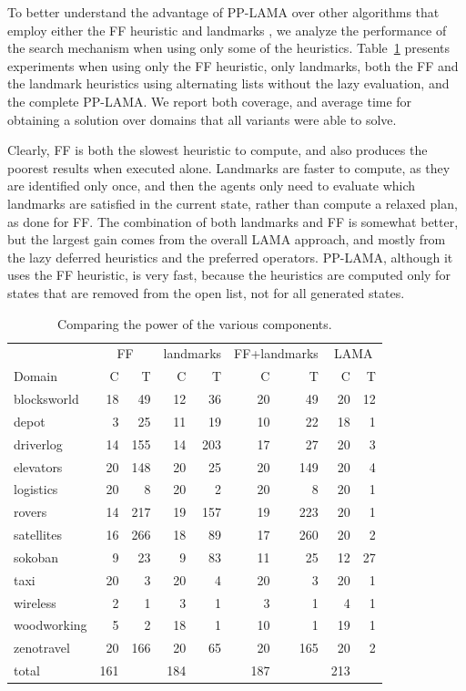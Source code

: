 \documentclass[letterpaper]{article}
\theoremstyle{definition}
\begin{document}
To better understand the advantage of PP-LAMA over other algorithms that employ either the FF heuristic \citep{vstolba2015admissible} and landmarks \citep{maliah2014privacyPreserving}, we analyze the performance of the search mechanism when using only some of the heuristics. Table~\ref{tbl:heuristics} presents experiments when using only the FF heuristic, only landmarks, both the FF and the landmark heuristics using alternating lists without the lazy evaluation, and the complete PP-LAMA. We report both coverage, and average time for obtaining a solution over domains that all variants were able to solve.

Clearly, FF is both the slowest heuristic to compute, and also produces the poorest results when executed alone. Landmarks are faster to compute, as they are identified only once, and then the agents only need to evaluate which landmarks are satisfied in the current state, rather than compute a relaxed plan, as done for FF. The combination of both landmarks and FF is somewhat better, but the largest gain comes from the overall LAMA approach, and mostly from the lazy deferred heuristics and the preferred operators. PP-LAMA, although it uses the FF heuristic, is very fast, because the heuristics are computed only for states that are removed from the open list, not for all generated states.


\begin{table}[t]
\scriptsize
\centering
\begin{tabular}{|l||r|r||r|r||r|r||r|r|}
\hline
			&\multicolumn{2}{c|}{FF}&\multicolumn{2}{c||}{landmarks}&\multicolumn{2}{c||}{FF+landmarks}&\multicolumn{2}{c|}{LAMA} 		\\ 
Domain&C&T&C&T&C&T&C&T \\ \hline\hline
blocksworld	&18	&49	&12	&36	&20	&49	&20	&12	\\ \hline
depot	&3	&25	&11	&19	&10	&22	&18	&1	\\ \hline
driverlog	&14	&155	&14	&203	&17	&27	&20	&3	\\ \hline
elevators	&20	&148	&20	&25	&20	&149	&20	&4	\\ \hline
logistics	&20	&8	&20	&2	&20	&8	&20	&1	\\ \hline
rovers	&14	&217	&19	&157	&19	&223	&20	&1	\\ \hline
satellites	&16	&266	&18	&89	&17	&260	&20	&2	\\ \hline
sokoban	&9	&23	&9	&83	&11	&25	&12	&27	\\ \hline
taxi	&20	&3	&20	&4	&20	&3	&20	&1	\\ \hline
wireless	&2	&1	&3	&1	&3	&1	&4	&1	\\ \hline
woodworking	&5	&2	&18	&1	&10	&1	&19	&1	\\ \hline
zenotravel	&20	&166	&20	&65	&20	&165	&20	&2	\\ \hline\hline
total	&161	&	&184	&	&187	&	&213	&	\\ \hline

\end{tabular}
\caption{Comparing the power of the various components.}
\label{tbl:heuristics}
\end{table}
\end{document}
